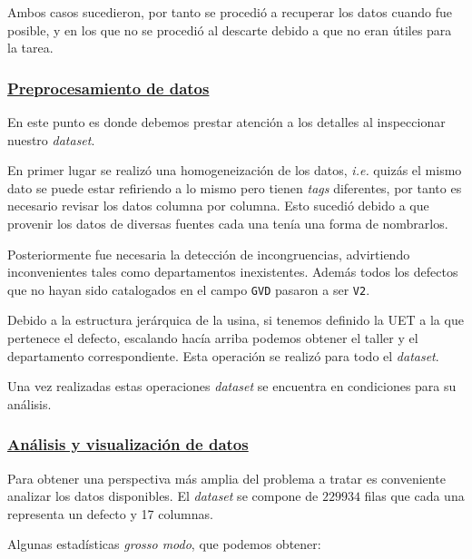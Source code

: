 \documentclass[a4paper,12pt]{article}
\begin{document}
		Ambos casos sucedieron, por tanto se procedió a recuperar los datos cuando fue posible, y en los que no se procedió al descarte debido a que no eran útiles para la tarea.
						
		\subsubsection{\href{https://github.com/GeraCollante/tesis-icomp-machinelearning/blob/main/DataPreproccesing.ipynb}{\color{blue}Preprocesamiento de datos}} \label{DataPreprocessing}
		En este punto es donde debemos prestar atención a los detalles al inspeccionar nuestro \textit{dataset}.
						
		En primer lugar se realizó una homogeneización de los datos, \textit{i.e.} quizás el mismo dato se puede estar refiriendo a lo mismo pero tienen \textit{tags} diferentes, por tanto es necesario revisar los datos columna por columna. Esto sucedió debido a que provenir los datos de diversas fuentes cada una tenía una forma de nombrarlos. 
						
		Posteriormente fue necesaria la detección de incongruencias, advirtiendo inconvenientes tales como departamentos inexistentes. Además todos los defectos que no hayan sido catalogados en el campo \texttt{GVD} pasaron a ser \texttt{V2}.
						
		Debido a la estructura jerárquica de la usina, si tenemos definido la UET a la que pertenece el defecto, escalando hacía arriba podemos obtener el taller y el departamento correspondiente. Esta operación se realizó para todo el \textit{dataset}.
						
		Una vez realizadas estas operaciones \textit{dataset} se encuentra en condiciones para su análisis.
						
		\subsubsection{\href{https://github.com/GeraCollante/tesis-icomp-machinelearning/blob/main/DataPlottingAndAnalysis.ipynb}{\color{blue}Análisis y visualización de datos}}\label{AnalysisVisualization}
		Para obtener una perspectiva más amplia del problema a tratar es conveniente analizar los datos disponibles. El \textit{dataset} se compone de $229934$ filas que cada una representa un defecto y 17 columnas.
						
		\clearpage				
						
		Algunas estadísticas \textit{grosso modo}, que podemos obtener:
						
\end{document}
